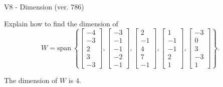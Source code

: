 \begin{exercise}
  \begin{exerciseTitle}V8 - Dimension (ver. 786)\end{exerciseTitle}
  \begin{exerciseStatement}
    Explain how to find the dimension of 
\[W=\mathrm{span}\ \left\{\left[\begin{array}{r}
-4 \\
-3 \\
2 \\
3 \\
-3
\end{array}\right] , \left[\begin{array}{r}
-3 \\
-1 \\
-1 \\
-2 \\
-1
\end{array}\right] , \left[\begin{array}{r}
2 \\
-1 \\
4 \\
7 \\
-1
\end{array}\right] , \left[\begin{array}{r}
1 \\
-1 \\
-1 \\
2 \\
1
\end{array}\right] , \left[\begin{array}{r}
-3 \\
0 \\
3 \\
-3 \\
1
\end{array}\right]\right\}.\]



  \end{exerciseStatement}
  \begin{exerciseAnswer}
   The dimension of \(W\) is  \(4\).
  


  \end{exerciseAnswer}
\end{exercise}